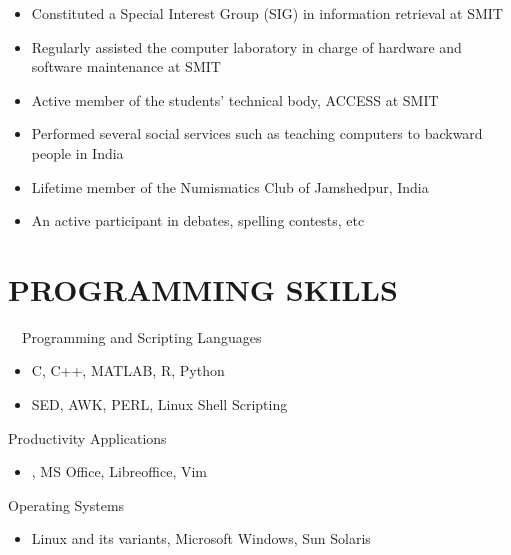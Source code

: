 \documentclass[margin]{res}
\begin{document}
\begin{resume}
\begin{itemize}
\item Constituted a Special Interest Group (SIG) in information retrieval at SMIT\\
\item Regularly assisted the computer laboratory in charge of hardware and software maintenance at SMIT\\
\item Active member of the students' technical body, ACCESS at SMIT\\
\item Performed several social services such as teaching computers to backward people in India\\
\item Lifetime member of the Numismatics Club of Jamshedpur, India\\
\item An active participant in debates, spelling contests, etc
\end{itemize}


\section{PROGRAMMING SKILLS}
~~Programming and Scripting Languages
\begin{itemize}\itemsep -10pt
\item C, C++, MATLAB, R, Python\\
\item SED, AWK, PERL, Linux Shell Scripting
\end{itemize}

Productivity Applications
\begin{itemize}\itemsep -10pt
\item \LaTeXe{}, MS Office, Libreoffice, Vim
\end{itemize}

Operating Systems
\begin{itemize}\itemsep -10pt
\item Linux and its variants, Microsoft Windows, Sun Solaris
\end{itemize}

\end{resume} 
\end{document}
